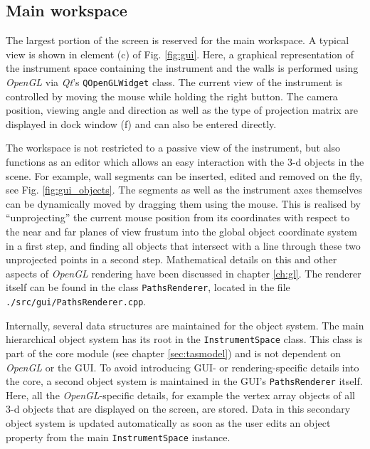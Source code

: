 \subsection{Main workspace}
\label{sec:gui_gl}
The largest portion of the screen is reserved for the main workspace.
A typical view is shown in element (c) of Fig. \ref{fig:gui}.
Here, a graphical representation of the instrument space containing the instrument and the walls 
is performed using \textit{OpenGL} \cite{web_OpenGL} via \textit{Qt}'s
\lstinline[language=C++]|QOpenGLWidget| \cite{web_QOpenGLWidget} class.
The current view of the instrument is controlled by moving the mouse while holding the right button.
The camera position, viewing angle and direction as well as the type of projection matrix are 
displayed in dock window (f) and can also be entered directly.

The workspace is not restricted to a passive view of the instrument, but also functions as an editor
which allows an easy interaction with the 3-d objects in the scene. For example, wall segments can
be inserted, edited and removed on the fly, see Fig. \ref{fig:gui_objects}.
The segments as well as the instrument axes themselves can be dynamically moved by dragging them using the 
mouse. This is realised by ``unprojecting'' the current mouse position from its coordinates with respect 
to the near and far planes of view frustum into the global object coordinate system in a first step, 
and finding all objects that intersect with a line through these two unprojected points in a second step. 
Mathematical details on this and other aspects of \textit{OpenGL} rendering have been discussed 
in chapter \ref{ch:gl}.
The renderer itself can be found in the class \lstinline[language=C++]|PathsRenderer|, located in
the file \lstinline|./src/gui/PathsRenderer.cpp|.

Internally, several data structures are maintained for the object system. 
The main hierarchical object system has its root in the \lstinline[language=C++]|InstrumentSpace|
class. This class is part of the core module (see chapter \ref{sec:tasmodel}) and is not dependent
on \textit{OpenGL} or the GUI.
To avoid introducing GUI- or rendering-specific details into the core, a second object
system is maintained in the GUI's \lstinline[language=C++]|PathsRenderer| itself. 
Here, all the \textit{OpenGL}-specific details, for example the vertex array objects \cite{wiki_vao} 
of all 3-d objects that are displayed on the screen, are stored.
Data in this secondary object system is updated automatically as soon as the user edits an object 
property from the main \lstinline[language=C++]|InstrumentSpace| instance.

